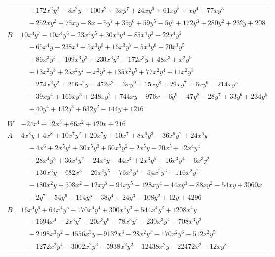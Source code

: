 \documentclass[11pt]{article}
\begin{document}
\begin{longtable}{@{}ll@{}}
 & $\quad +172x^{2}y^{2}-8x^{2}y-100x^{2}+3xy^{7}+24xy^{6}+61xy^{5}+xy^{4}+77xy^{3}$\\
 & $\quad +252xy^{2}+76xy-8x-5y^{7}+35y^{6}+59y^{5}-5y^{4}+172y^{3}+280y^{2}+232y+208$\\
$B$ & $10x^{4}y^{7}-10x^{4}y^{6}-23x^{4}y^{5}+30x^{4}y^{4}-85x^{4}y^{3}-22x^{4}y^{2}$\\
 & $\quad -65x^{4}y-238x^{4}+5x^{3}y^{8}+16x^{3}y^{7}-5x^{3}y^{6}+20x^{3}y^{5}$\\
 & $\quad +86x^{3}y^{4}-109x^{3}y^{3}+230x^{3}y^{2}-172x^{3}y+48x^{3}+x^{2}y^{9}$\\
 & $\quad +13x^{2}y^{8}+25x^{2}y^{7}-x^{2}y^{6}+135x^{2}y^{5}+77x^{2}y^{4}+11x^{2}y^{3}$\\
 & $\quad +274x^{2}y^{2}+216x^{2}y-472x^{2}+3xy^{9}+15xy^{8}+29xy^{7}+6xy^{6}+214xy^{5}$\\
 & $\quad +39xy^{4}+166xy^{3}+248xy^{2}+744xy-976x-6y^{9}+47y^{8}-28y^{7}+33y^{6}+234y^{5}$\\
 & $\quad +40y^{4}+132y^{3}+632y^{2}-144y+1216$\\
\addlinespace[3pt]
\multicolumn{2}{@{}l}{$i=9$, $m=1$, neighbours $37,2,12,14,15,17,19,24,28,31$}\\
$W$ & $-24x^{4}+12x^{3}+66x^{2}+120x+216$\\
$A$ & $4x^{8}y+4x^{8}+10x^{7}y^{2}+20x^{7}y+10x^{7}+8x^{6}y^{3}+36x^{6}y^{2}+24x^{6}y$\\
 & $\quad -4x^{6}+2x^{5}y^{4}+30x^{5}y^{3}+50x^{5}y^{2}+2x^{5}y-20x^{5}+12x^{4}y^{4}$\\
 & $\quad +28x^{4}y^{3}+36x^{4}y^{2}-24x^{4}y-44x^{4}+2x^{3}y^{5}-16x^{3}y^{4}-6x^{3}y^{2}$\\
 & $\quad -130x^{3}y-682x^{3}-26x^{2}y^{5}-76x^{2}y^{4}-54x^{2}y^{3}-116x^{2}y^{2}$\\
 & $\quad -180x^{2}y+508x^{2}-12xy^{6}-94xy^{5}-128xy^{4}-44xy^{3}-88xy^{2}-54xy+3060x$\\
 & $\quad -2y^{7}-54y^{6}-114y^{5}-38y^{4}+24y^{3}-108y^{2}+12y+4296$\\
$B$ & $16x^{4}y^{6}+64x^{4}y^{5}+170x^{4}y^{4}+300x^{4}y^{3}+544x^{4}y^{2}+1208x^{4}y$\\
 & $\quad +1694x^{4}+2x^{3}y^{7}-20x^{3}y^{6}-78x^{3}y^{5}-230x^{3}y^{4}-708x^{3}y^{3}$\\
 & $\quad -2198x^{3}y^{2}-4556x^{3}y-9132x^{3}-28x^{2}y^{7}-170x^{2}y^{6}-512x^{2}y^{5}$\\
 & $\quad -1272x^{2}y^{4}-3002x^{2}y^{3}-5938x^{2}y^{2}-12438x^{2}y-22472x^{2}-12xy^{8}$\\

\end{longtable}
\end{document}
